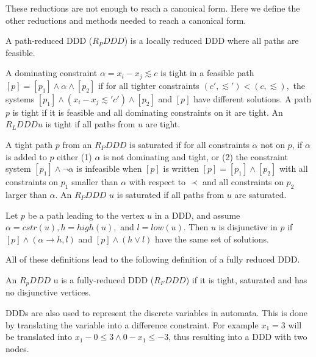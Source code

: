 \documentclass[11pt]{article}
\begin{document}
These reductions are not enough to reach a canonical form. Here we define the other reductions and methods needed to reach a canonical form.

\begin{mydef}
A path-reduced DDD ($R_PDDD$) is a locally reduced DDD where all paths are feasible.
\end{mydef}

\begin{mydef}
A dominating constraint $\alpha = x_i - x_j \lesssim c$ is tight in a feasible path $[p] = [p_1] \wedge \alpha \wedge [p_2]$ if for all tighter constraints $(c', \lesssim') < (c,\lesssim),$ the systems $[p_1] \wedge (x_i - x_j \lesssim' c') \wedge [p_2]$ and $[p]$ have different solutions. A path $p$ is tight if it is feasible and all dominating constraints on it are tight. An $R_LDDD u$ is tight if all paths from $u$ are tight. 
\end{mydef}

\begin{mydef}
A tight path $p$ from an $R_PDDD$ is saturated if for all constraints $\alpha$ not on $p$, if $\alpha$ is added to $p$ either (1) $\alpha$ is not dominating and tight, or (2) the constraint system $[p_1] \wedge \neg\alpha$ is infeasible when $[p]$ is written $[p] = [p_1] \wedge [p_2]$ with all constraints on $p_1$ smaller than $\alpha$ with respect to $\prec$ and all constraints on $p_2$ larger than $\alpha$. An $R_PDDD$ $u$ is saturated if all paths from $u$ are saturated.
\end{mydef}

\begin{mydef}
Let $p$ be a path leading to the vertex $u$ in a DDD, and assume $\alpha = cstr(u), h = high(u),$ and $l = low(u)$. Then $u$ is disjunctive in $p$ if $[p] \wedge (\alpha \rightarrow h,l)$ and $[p] \wedge (h \vee l)$ have the same set of solutions.
\end{mydef}

All of these definitions lead to the following definition of a fully reduced DDD.
% 
\begin{mydef}
\label{def:RFDDD}
An $R_pDDD$ u is a fully-reduced DDD ($R_FDDD$) if it is tight, saturated and has no disjunctive vertices.
\end{mydef}

DDDs are also used to represent the discrete variables in automata. This is done by translating the variable into a difference constraint. For example $x_1 = 3$ will be translated into $x_1 - 0 \leq 3 \wedge 0 - x_1 \leq -3$, thus resulting into a DDD with two nodes. 
\end{document}
